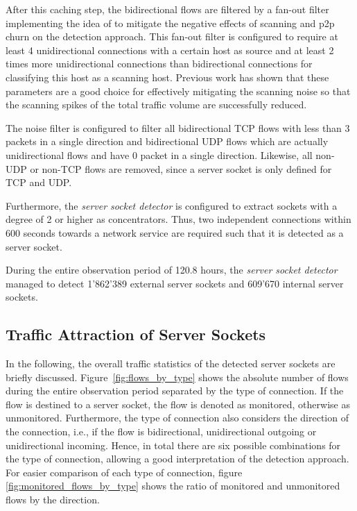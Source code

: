 After this caching step, the bidirectional flows are filtered by a fan-out filter implementing the idea of \citet{Allman:2007} to mitigate the negative effects of scanning and \gls{p2p} churn on the detection approach. 
This fan-out filter is configured to require at least 4 unidirectional connections with a certain host as source and at least 2 times more unidirectional connections than bidirectional connections for classifying this host as a scanning host. 
Previous work \citep{Schatzmann:Mining,Schatzmann:Dissection, Schatzmann:Tracing} has shown that these parameters are a good choice for effectively mitigating the scanning noise so that the scanning spikes of the total traffic volume are successfully reduced.

The noise filter is configured to filter all bidirectional \gls{TCP} flows with less than 3 packets in a single direction and bidirectional \gls{UDP} flows which are actually unidirectional flows and have 0 packet in a single direction. Likewise, all non-UDP or non-TCP flows are removed, since a \gls{server socket} is only defined for TCP and UDP. 

Furthermore, the \emph{server socket detector} is configured to extract sockets with a degree of 2 or higher as concentrators.
Thus, two independent connections within 600 seconds towards a network service are required such that it is detected as a \gls{server socket}.

During the entire observation period of 120.8 hours, the \emph{server socket detector} managed to detect 1'862'389 external \glspl{server socket} and 609'670 internal \glspl{server socket}.

\subsection{Traffic Attraction of Server Sockets}

In the following, the overall traffic statistics of the detected \glspl{server socket} are briefly discussed. Figure \ref{fig:flows_by_type} shows the absolute number of flows during the entire observation period separated by the type of connection. 
If the flow is destined to a \gls{server socket}, the flow is denoted as monitored, otherwise as unmonitored. 
Furthermore, the type of connection also considers the direction of the connection, i.e., if the flow is bidirectional, unidirectional outgoing or unidirectional incoming. 
Hence, in total there are six possible combinations for the type of connection, allowing a good interpretation of the detection approach. 
For easier comparison of each type of connection, figure \ref{fig:monitored_flows_by_type} shows the ratio of monitored and unmonitored flows by the direction.

